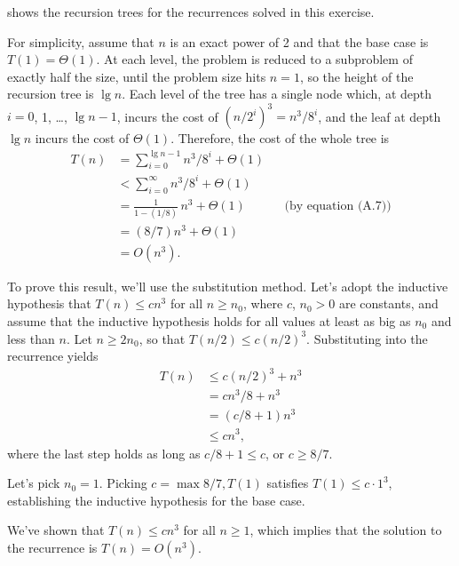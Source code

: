  shows the recursion trees for the recurrences solved in this exercise.
\vspace*{2\baselineskip}

\subexercise
For simplicity, assume that $n$ is an exact power of 2 and that the base case is $T(1)=\Theta(1)$.
At each level, the problem is reduced to a subproblem of exactly half the size, until the problem size hits $n=1$, so the height of the recursion tree is $\lg n$.
Each level of the tree has a single node which, at depth $i=0$, 1, \dots, $\lg n-1$, incurs the cost of $(n/2^i)^3=n^3\!/8^i$, and the leaf at depth $\lg n$ incurs the cost of $\Theta(1)$.
Therefore, the cost of the whole tree is
\begin{align*}
    T(n) &= \sum_{i=0}^{\lg n-1}n^3\!/8^i+\Theta(1) \\
    &< \sum_{i=0}^\infty n^3\!/8^i+\Theta(1) \\
    &= \frac{1}{1-(1/8)}\,n^3+\Theta(1) && \text{(by equation (A.7))} \\[1mm]
    &= (8/7)n^3+\Theta(1) \\
    &= O(n^3).
\end{align*}

To prove this result, we'll use the substitution method.
Let's adopt the inductive hypothesis that $T(n)\le cn^3$ for all $n\ge n_0$, where $c$, $n_0>0$ are constants, and assume that the inductive hypothesis holds for all values at least as big as $n_0$ and less than $n$.
Let $n\ge2n_0$, so that $T(n/2)\le c(n/2)^3$.
Substituting into the recurrence yields
\begin{align*}
    T(n) &\le c(n/2)^3+n^3 \\
    &= cn^3\!/8+n^3 \\
    &= (c/8+1)n^3 \\
    &\le cn^3,
\end{align*}
where the last step holds as long as $c/8+1\le c$, or $c\ge8/7$.

Let's pick $n_0=1$.
Picking $c=\max{8/7,T(1)}$ satisfies $T(1)\le c\cdot1^3$, establishing the inductive hypothesis for the base case.

We've shown that $T(n)\le cn^3$ for all $n\ge1$, which implies that the solution to the recurrence is $T(n)=O(n^3)$.

